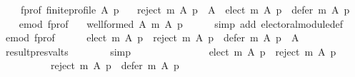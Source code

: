 \begin{isabellebody}
\ \ \ \ f{\isacharunderscore}{\kern0pt}prof{\isacharcolon}{\kern0pt}\ {\isachardoublequoteopen}finite{\isacharunderscore}{\kern0pt}profile\ A\ p{\isachardoublequoteclose}\isanewline
\ \ \ {\isachardoublequoteopen}reject\ m\ A\ p\ {\isacharequal}{\kern0pt}\ A\ {\isacharminus}{\kern0pt}\ {\isacharparenleft}{\kern0pt}elect\ m\ A\ p{\isacharparenright}{\kern0pt}\ {\isacharminus}{\kern0pt}\ {\isacharparenleft}{\kern0pt}defer\ m\ A\ p{\isacharparenright}{\kern0pt}{\isachardoublequoteclose}\isanewline
%
\isadelimproof
%
\endisadelimproof
%
\isatagproof
{}\isamarkupfalse%
\ {\isacharminus}{\kern0pt}\isanewline
\ \ \isamarkupfalse%
\ e{\isacharunderscore}{\kern0pt}mod\ f{\isacharunderscore}{\kern0pt}prof\ \isamarkupfalse%
\ {}{\isacharcolon}{\kern0pt}\ {\isachardoublequoteopen}well{\isacharunderscore}{\kern0pt}formed\ A\ {\isacharparenleft}{\kern0pt}m\ A\ p{\isacharparenright}{\kern0pt}{\isachardoublequoteclose}\isanewline
\ \ \ \ \isamarkupfalse%
\ {\isacharparenleft}{\kern0pt}simp\ add{\isacharcolon}{\kern0pt}\ electoral{\isacharunderscore}{\kern0pt}module{\isacharunderscore}{\kern0pt}def{\isacharparenright}{\kern0pt}\isanewline
\ \ \isamarkupfalse%
\ e{\isacharunderscore}{\kern0pt}mod\ f{\isacharunderscore}{\kern0pt}prof\isanewline
\ \ \ \ \isamarkupfalse%
\ {\isachardoublequoteopen}{\isacharparenleft}{\kern0pt}elect\ m\ A\ p{\isacharparenright}{\kern0pt}\ {\isasymunion}\ {\isacharparenleft}{\kern0pt}reject\ m\ A\ p{\isacharparenright}{\kern0pt}\ {\isasymunion}\ {\isacharparenleft}{\kern0pt}defer\ m\ A\ p{\isacharparenright}{\kern0pt}\ {\isacharequal}{\kern0pt}\ A{\isachardoublequoteclose}\isanewline
\ \ \ \ \ \ \isamarkupfalse%
\ result{\isacharunderscore}{\kern0pt}presv{\isacharunderscore}{\kern0pt}alts\isanewline
\ \ \ \ \ \ \isamarkupfalse%
\ simp\isanewline
\ \ \ \ \isamarkupfalse%
\ \isamarkupfalse%
\ {}\ \isamarkupfalse%
\isanewline
\ \ \ \ \ \ {\isachardoublequoteopen}{\isacharparenleft}{\kern0pt}elect\ m\ A\ p{\isacharparenright}{\kern0pt}\ {\isasyminter}\ {\isacharparenleft}{\kern0pt}reject\ m\ A\ p{\isacharparenright}{\kern0pt}\ {\isacharequal}{\kern0pt}\ {\isacharbraceleft}{\kern0pt}{\isacharbraceright}{\kern0pt}\ {\isasymand}\isanewline
\ \ \ \ \ \ \ \ \ \ {\isacharparenleft}{\kern0pt}reject\ m\ A\ p{\isacharparenright}{\kern0pt}\ {\isasyminter}\ {\isacharparenleft}{\kern0pt}defer\ m\ A\ p{\isacharparenright}{\kern0pt}\ {\isacharequal}{\kern0pt}\ {\isacharbraceleft}{\kern0pt}{\isacharbraceright}{\kern0pt}{\isachardoublequoteclose}\isanewline

\end{isabellebody}
